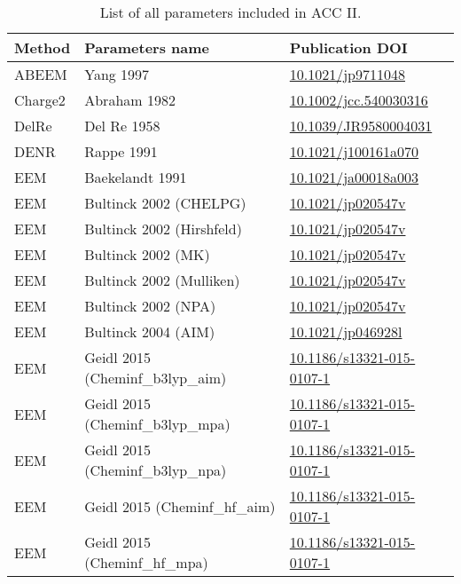 \documentclass[oneside]{memoir}
\begin{document}
\begin{table}
\renewcommand{\tablename}{\textbf{Supplementary table}}
\renewcommand\thetable{\textbf{1}}
\caption{List of all parameters included in ACC II.}
\begin{tabular}{lll}
\toprule
\textbf{Method} & \textbf{Parameters name} & \textbf{Publication DOI}\\
\midrule
ABEEM & Yang 1997 & \href{https://doi.org/10.1021/jp9711048}{10.1021/jp9711048}\\
Charge2 & Abraham 1982 & \href{https://doi.org/10.1002/jcc.540030316}{10.1002/jcc.540030316}\\
DelRe & Del Re 1958 & \href{https://doi.org/10.1039/JR9580004031}{10.1039/JR9580004031}\\
DENR & Rappe 1991 & \href{https://doi.org/10.1021/j100161a070}{10.1021/j100161a070}\\
EEM & Baekelandt 1991 & \href{https://doi.org/10.1021/ja00018a003}{10.1021/ja00018a003}\\
EEM & Bultinck 2002 (CHELPG) & \href{https://doi.org/10.1021/jp020547v}{10.1021/jp020547v}\\
EEM & Bultinck 2002 (Hirshfeld) & \href{https://doi.org/10.1021/jp020547v}{10.1021/jp020547v}\\
EEM & Bultinck 2002 (MK) & \href{https://doi.org/10.1021/jp020547v}{10.1021/jp020547v}\\
EEM & Bultinck 2002 (Mulliken) & \href{https://doi.org/10.1021/jp020547v}{10.1021/jp020547v}\\
EEM & Bultinck 2002 (NPA) & \href{https://doi.org/10.1021/jp020547v}{10.1021/jp020547v}\\
EEM & Bultinck 2004 (AIM) & \href{https://doi.org/10.1021/jp046928l}{10.1021/jp046928l}\\
EEM & Geidl 2015 (Cheminf\_b3lyp\_aim) & \href{https://doi.org/10.1186/s13321-015-0107-1}{10.1186/s13321-015-0107-1}\\
EEM & Geidl 2015 (Cheminf\_b3lyp\_mpa) & \href{https://doi.org/10.1186/s13321-015-0107-1}{10.1186/s13321-015-0107-1}\\
EEM & Geidl 2015 (Cheminf\_b3lyp\_npa) & \href{https://doi.org/10.1186/s13321-015-0107-1}{10.1186/s13321-015-0107-1}\\
EEM & Geidl 2015 (Cheminf\_hf\_aim) & \href{https://doi.org/10.1186/s13321-015-0107-1}{10.1186/s13321-015-0107-1}\\
EEM & Geidl 2015 (Cheminf\_hf\_mpa) & \href{https://doi.org/10.1186/s13321-015-0107-1}{10.1186/s13321-015-0107-1}\\

\end{tabular}
\end{table}
\end{document}
